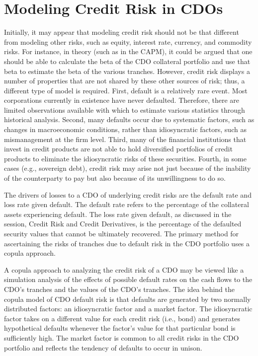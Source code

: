 \documentclass[11pt]{article}
\begin{document}
\section*{Modeling Credit Risk in CDOs}
Initially, it may appear that modeling credit risk should not be that different from modeling other risks, such as equity, interest rate, currency, and commodity risks. For instance, in theory (such as in the CAPM), it could be argued that one should be able to calculate the beta of the CDO collateral portfolio and use that beta to estimate the beta of the various tranches. However, credit risk displays a number of properties that are not shared by these other sources of risk; thus, a different type of model is required. First, default is a relatively rare event. Most corporations currently in existence have never defaulted. Therefore, there are limited observations available with which to estimate various statistics through historical analysis. Second, many defaults occur due to systematic factors, such as changes in macroeconomic conditions, rather than idiosyncratic factors, such as mismanagement at the firm level. Third, many of the financial institutions that invest in credit products are not able to hold diversified portfolios of credit products to eliminate the idiosyncratic risks of these securities. Fourth, in some cases (e.g., sovereign debt), credit risk may arise not just because of the inability of the counterparty to pay but also because of its unwillingness to do so.

The drivers of losses to a CDO of underlying credit risks are the default rate and loss rate given default. The default rate refers to the percentage of the collateral assets experiencing default. The loss rate given default, as discussed in the session, Credit Risk and Credit Derivatives, is the percentage of the defaulted security values that cannot be ultimately recovered. The primary method for ascertaining the risks of tranches due to default risk in the CDO portfolio uses a copula approach.

A copula approach to analyzing the credit risk of a CDO may be viewed like a simulation analysis of the effects of possible default rates on the cash flows to the CDO's tranches and the values of the CDO's tranches. The idea behind the copula model of CDO default risk is that defaults are generated by two normally distributed factors: an idiosyncratic factor and a market factor. The idiosyncratic factor takes on a different value for each credit risk (i.e., bond) and generates hypothetical defaults whenever the factor's value for that particular bond is sufficiently high. The market factor is common to all credit risks in the CDO portfolio and reflects the tendency of defaults to occur in unison.
\end{document}
